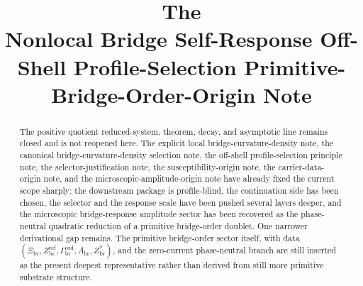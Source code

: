 \documentclass[11pt]{article}
\title{\textbf{The \TheoryName{}}\\[0.4em]
\large Nonlocal Bridge Self-Response Off-Shell Profile-Selection Primitive-Bridge-Order-Origin Note}
\author{}
\date{}
\newcommand{\RespOrderRef}{Z_{\mathrm{br}}^{\mathrm{ref}}}
\newcommand{\RespOrderEq}{Z_{\mathrm{br}}^{\ast}}
\newcommand{\RespOrderReadout}{\Xi_{\mathrm{br}}}
\newcommand{\RespOrderStiff}{\Gamma_{\mathrm{br}}^{\mathrm{ord}}}
\newcommand{\RespOrderQuartic}{\Lambda_{\mathrm{br}}}
\begin{document}
\maketitle

\begin{abstract}
The positive quotient reduced-system, theorem, decay, and asymptotic line remains closed and is not reopened here. The explicit local bridge-curvature-density note, the canonical bridge-curvature-density selection note, the off-shell profile-selection principle note, the selector-justification note, the susceptibility-origin note, the carrier-data-origin note, and the microscopic-amplitude-origin note have already fixed the current scope sharply: the downstream package is profile-blind, the continuation side has been chosen, the selector and the response scale have been pushed several layers deeper, and the microscopic bridge-response amplitude sector has been recovered as the phase-neutral quadratic reduction of a primitive bridge-order doublet. One narrower derivational gap remains. The primitive bridge-order sector itself, with data \((\RespOrderReadout,\RespOrderRef,\RespOrderStiff,\RespOrderQuartic,\RespOrderEq)\), and the zero-current phase-neutral branch are still inserted as the present deepest representative rather than derived from still more primitive substrate structure.


\end{abstract}
\end{document}
